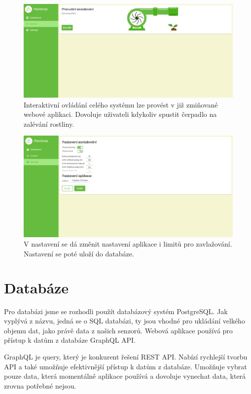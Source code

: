 \documentclass[12pt,a4paper]{article}
\begin{document}
\begin{figure}[h]
	\centering
	\includegraphics[width=\linewidth]{web-ui-pump.png}
	\caption{Interaktivní ovládání celého systému lze provést v již
		zmiňované webové aplikaci. Dovoluje uživateli kdykoliv spustit
		čerpadlo na
		zalévání rostliny.}
\end{figure}

\begin{figure}[h]
	\centering
	\includegraphics[width=\linewidth]{web-ui-settings.png}
	\caption{V nastavení se dá změnit nastavení aplikace i limitů pro
		zavlažování. Nastavení se poté uloží do databáze.}
\end{figure}

\clearpage

\section{Databáze}

Pro databázi jsme se rozhodli použít databázový systém PostgreSQL. Jak vyplývá
z názvu, jedná se o SQL databázi, ty jsou vhodné pro ukládání velkého objemu
dat, jako právě data z našich senzorů. Webová aplikace používá pro přístup k
datům z databáze GraphQL API.

GraphQL je query, který je konkurent řešení REST API. Nabízí rychlejší
tvorbu API a také umožňuje efektivnější přístup k datům z databáze. Umožňuje
vybrat pouze data, která momentálně aplikace používá a dovoluje vynechat data,
která zrovna potřebné nejsou.
\end{document}
